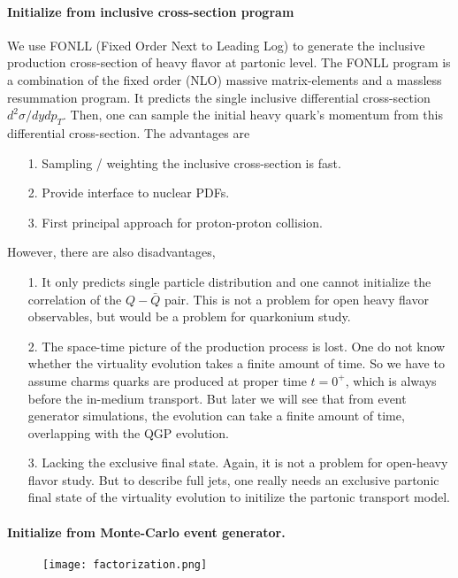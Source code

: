 \paragraph{Initialize from inclusive cross-section program}
We use FONLL (Fixed Order Next to Leading Log) to generate the inclusive production cross-section of heavy flavor at partonic level.
The FONLL program is a combination of the fixed order (NLO) massive matrix-elements and a massless resummation program.
It predicts the single inclusive differential cross-section $d^2\sigma/dydp_T$. 
Then, one can sample the initial heavy quark's momentum from this differential cross-section.
The advantages are
\begin{itemize}
\item[1.] Sampling / weighting the inclusive cross-section is fast.
\item[2.] Provide interface to nuclear PDFs.
\item[3.] First principal approach for proton-proton collision.
\end{itemize} 
However, there are also disadvantages, 
\begin{itemize}
\item[1.] It only predicts single particle distribution and one cannot initialize the correlation of the $Q-\bar{Q}$ pair. This is not a problem for open heavy flavor observables, but would be a problem for quarkonium study.
\item[2.] The space-time picture of the production process is lost. One do not know whether the virtuality evolution takes a finite amount of time. So we have to assume charms quarks are produced at proper time $t=0^{+}$, which is always before the in-medium transport. But later we will see that from event generator simulations, the evolution can take a finite amount of time, overlapping with the QGP evolution.
\item[3.] Lacking the exclusive final state. Again, it is not a problem for open-heavy flavor study. But to describe full jets, one really needs an exclusive partonic final state of the virtuality evolution to initilize the partonic transport model.
\end{itemize}

\paragraph{Initialize from Monte-Carlo event generator.}
\begin{figure}
\centering
\texttt{[image: factorization.png]}
\caption{
}
\label{fig:factorization}
\end{figure}

